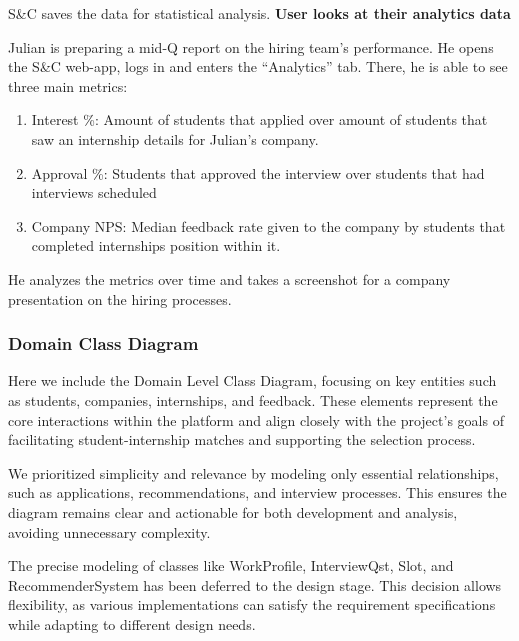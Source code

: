 S\&C saves the data for statistical analysis.
\textbf{User looks at their analytics data}

Julian is preparing a mid-Q report on the hiring team’s performance. He opens the S\&C web-app, logs in and enters the “Analytics” tab. There, he is able to see three main metrics:

\begin{enumerate}
    \item Interest \%: Amount of students that applied over amount of students that saw an internship details for Julian’s company.
    \item Approval \%: Students that approved the interview over students that had interviews scheduled
    \item  Company NPS: Median feedback rate given to the company by students that completed internships position within it.
\end{enumerate}

He analyzes the metrics over time and takes a screenshot for a company presentation on the hiring processes.
\clearpage
\subsubsection{Domain Class Diagram}

Here we include the Domain Level Class Diagram, focusing on key entities such as students, companies, internships, and feedback. These elements represent the core interactions within the platform and align closely with the project's goals of facilitating student-internship matches and supporting the selection process.

We prioritized simplicity and relevance by modeling only essential relationships, such as applications, recommendations, and interview processes. This ensures the diagram remains clear and actionable for both development and analysis, avoiding unnecessary complexity.

The precise modeling of classes like WorkProfile, InterviewQst, Slot, and RecommenderSystem has been deferred to the design stage. This decision allows flexibility, as various implementations can satisfy the requirement specifications while adapting to different design needs.

